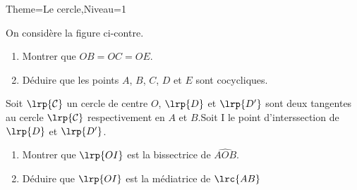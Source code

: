\documentclass[a4paper,12pt]{article}
\begin{document}
\begin{Maquette}[Fiche]{Theme=Le cercle,Niveau=1}
\begin{exercice}
\begin{minipage}{0.6\linewidth}
On considère la figure ci-contre.
\begin{enumerate}
\item Montrer que $OB=OC=OE$.
\item Déduire que les points $A$, $B$, $C$, $D$ et $E$ sont cocycliques.
\end{enumerate}
\end{minipage}%
\begin{minipage}{0.4\linewidth}
\end{minipage}
\end{exercice}

\begin{exercice}
\begin{minipage}{0.6\linewidth}
Soit $\lrp{\mathcal{C}}$ un cercle de centre $O$, $\lrp{D}$ et $\lrp{D'}$ sont deux tangentes au cercle $\lrp{\mathcal{C}}$ respectivement en $A$ et $B$.Soit I le point d'interssection de $\lrp{D}$ et $\lrp{D'}$.
\begin{enumerate}
\item Montrer que $\lrp{OI}$ est la bissectrice de $\widehat{AOB}$.
\item Déduire que $\lrp{OI}$ est la médiatrice de $\lrc{AB}$
\end{enumerate}
\end{minipage}%
\begin{minipage}{0.4\linewidth}
\end{minipage}
\end{exercice}






\end{Maquette}
\end{document}
